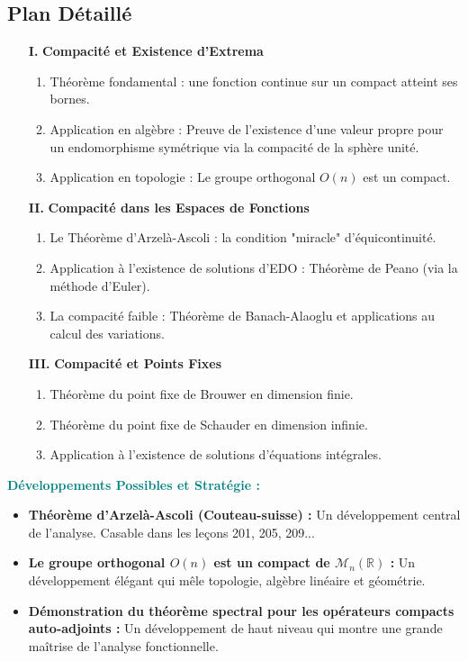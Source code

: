 \documentclass[12pt, a4paper, parskip=full]{report}
\theoremstyle{agregstyle}
\newenvironment{developpements}
  {\par\medskip\noindent\begin{oframed}\noindent\textbf{\textcolor{teal}{Développements Possibles et Stratégie :}}}
  {\end{oframed}\par\medskip}
\begin{document}
\subsection*{Plan Détaillé}
\begin{itemize}
    \item[\textbf{I.}] \textbf{Compacité et Existence d'Extrema}
    \begin{enumerate}
        \item Théorème fondamental : une fonction continue sur un compact atteint ses bornes.
        \item Application en algèbre : Preuve de l'existence d'une valeur propre pour un endomorphisme symétrique via la compacité de la sphère unité.
        \item Application en topologie : Le groupe orthogonal $O(n)$ est un compact.
    \end{enumerate}
    \item[\textbf{II.}] \textbf{Compacité dans les Espaces de Fonctions}
    \begin{enumerate}
        \item Le Théorème d'Arzelà-Ascoli : la condition "miracle" d'équicontinuité.
        \item Application à l'existence de solutions d'EDO : Théorème de Peano (via la méthode d'Euler).
        \item La compacité faible : Théorème de Banach-Alaoglu et applications au calcul des variations.
    \end{enumerate}
    \item[\textbf{III.}] \textbf{Compacité et Points Fixes}
    \begin{enumerate}
        \item Théorème du point fixe de Brouwer en dimension finie.
        \item Théorème du point fixe de Schauder en dimension infinie.
        \item Application à l'existence de solutions d'équations intégrales.
    \end{enumerate}
\end{itemize}

\begin{developpements}
    \begin{itemize}
        \item \textbf{Théorème d'Arzelà-Ascoli (Couteau-suisse) :} Un développement central de l'analyse. Casable dans les leçons 201, 205, 209...
        \item \textbf{Le groupe orthogonal $O(n)$ est un compact de $\mathcal{M}_n(\mathbb{R})$ :} Un développement élégant qui mêle topologie, algèbre linéaire et géométrie.
        \item \textbf{Démonstration du théorème spectral pour les opérateurs compacts auto-adjoints :} Un développement de haut niveau qui montre une grande maîtrise de l'analyse fonctionnelle.
    \end{itemize}
\end{developpements}
\end{document}
